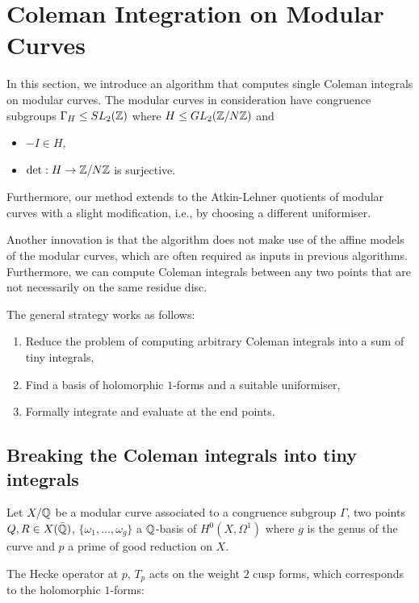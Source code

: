 \chapter{Coleman Integration on Modular Curves}

In this section, we introduce an algorithm that computes single Coleman integrals on modular curves. The modular curves in consideration have congruence subgroups $\Gamma_H \leq SL_2(\mathbb{Z})$ where $H \leq GL_2(\mathbb{Z}/N\mathbb{Z})$ and

\begin{itemize}
    \item $-I \in H$,
    \item $\det: H \rightarrow \mathbb{Z}/N\mathbb{Z}$ is surjective.
\end{itemize}

Furthermore, our method extends to the Atkin-Lehner quotients of modular curves with a slight modification, i.e., by choosing a different uniformiser.

Another innovation is that the algorithm does not make use of the affine models of the modular curves, which are often required as inputs in previous algorithms. Furthermore, we can compute Coleman integrals between any two points that are not necessarily on the same residue disc. 


The general strategy works as follows:

\begin{enumerate}
    \item Reduce the problem of computing arbitrary Coleman integrals into a sum of tiny integrals,
    \item Find a basis of holomorphic $1$-forms and a suitable uniformiser,
    \item Formally integrate and evaluate at the end points.
\end{enumerate}


\section{Breaking the Coleman integrals into tiny integrals}

Let $X/\mathbb{Q}$ be a modular curve associated to a congruence subgroup $\Gamma$, two points $Q,R \in X(\bar{\mathbb{Q}})$, $\{\omega_1, \ldots, \omega_g\}$ a $\mathbb{Q}$-basis of $H^0(X,\Omega^1)$ where $g$ is the genus of the curve and $p$ a prime of good reduction on $X$.

The Hecke operator at $p$, $T_p$ acts on the weight $2$ cusp forms, which corresponds to the holomorphic $1$-forms:

